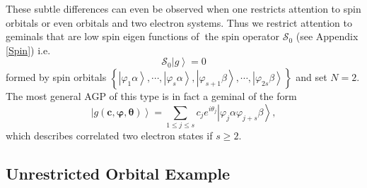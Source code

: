 \documentclass[aps,preprint]{revtex4}%
\begin{document}
These subtle differences can even be observed when one restricts attention to
spin orbitals or even orbitals and two electron systems. Thus we restrict
attention to geminals that are low spin eigen functions of $\ $the spin
operator $\mathcal{S}_{0}$ (see Appendix \ref{Spin}) i.e.
\begin{equation}
\mathcal{S}_{0}\left\vert g\right\rangle =0
\end{equation}
formed by spin orbitals $\left\{  \left\vert \varphi_{1}\alpha\right\rangle
,\cdots,\left\vert \varphi_{s}\alpha\right\rangle ,\left\vert \varphi
_{s+1}\beta\right\rangle ,\cdots,\left\vert \varphi_{2s}\beta\right\rangle
\right\}  $ and set $N=2$. The most general AGP of this type is in fact a
geminal of the form%
\begin{equation}
\left\vert g\left(  \bm{c},\bm{\varphi,\theta}\right)  \right\rangle
=\sum_{1\leq j\leq s}c_{j}e^{i\theta_{j}}\left\vert \varphi_{j}\alpha
\varphi_{j+s}\beta\right\rangle , \label{spinorbgem}%
\end{equation}
which describes correlated two electron states if $s\geq2$.

\subsection{Unrestricted Orbital Example}
\end{document}
